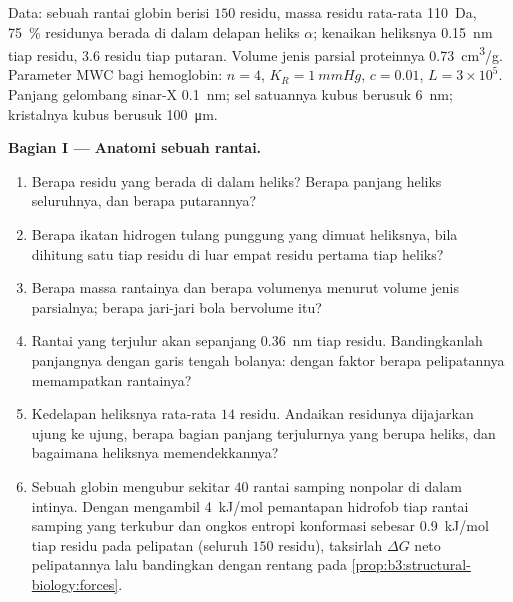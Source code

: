 \begin{problem}
\label{pb:b3:structural-biology:1}
Data: sebuah rantai globin berisi $150$ residu, massa residu rata-rata \qty{110}{Da},
\qty{75}{\%} residunya berada di dalam delapan heliks $\alpha$; kenaikan
heliksnya \qty{0.15}{nm} tiap residu, $3.6$ residu tiap putaran. Volume jenis
parsial proteinnya \qty{0.73}{cm^3/g}. Parameter MWC bagi hemoglobin:
$n = 4$, $K_{R} = \qty{1}{mmHg}$, $c = 0.01$, $L = 3\times 10^{5}$.
Panjang gelombang sinar-X \qty{0.1}{nm}; sel satuannya kubus berusuk \qty{6}{nm};
kristalnya kubus berusuk \qty{100}{\micro m}.

\medskip
\noindent\textbf{Bagian I --- Anatomi sebuah rantai.}
\begin{enumerate}
  \item Berapa residu yang berada di dalam heliks? Berapa panjang heliks
        seluruhnya, dan berapa putarannya?
  \item Berapa ikatan hidrogen tulang punggung yang dimuat heliksnya, bila
        dihitung satu tiap residu di luar empat residu pertama tiap heliks?
  \item Berapa massa rantainya dan berapa volumenya menurut volume jenis
        parsialnya; berapa jari-jari bola bervolume itu?
  \item Rantai yang terjulur akan sepanjang \qty{0.36}{nm} tiap residu.
        Bandingkanlah panjangnya dengan garis tengah bolanya: dengan faktor
        berapa pelipatannya memampatkan rantainya?
  \item Kedelapan heliksnya rata-rata $14$ residu. Andaikan residunya
        dijajarkan ujung ke ujung, berapa bagian panjang terjulurnya yang
        berupa heliks, dan bagaimana heliksnya memendekkannya?
  \item Sebuah globin mengubur sekitar $40$ rantai samping nonpolar di dalam
        intinya. Dengan mengambil \qty{4}{kJ/mol} pemantapan hidrofob tiap
        rantai samping yang terkubur dan ongkos entropi konformasi sebesar
        \qty{0.9}{kJ/mol} tiap residu pada pelipatan (seluruh $150$ residu),
        taksirlah $\Delta G$ neto pelipatannya lalu bandingkan dengan
        rentang pada \cref{prop:b3:structural-biology:forces}.
\end{enumerate}


\end{problem}
